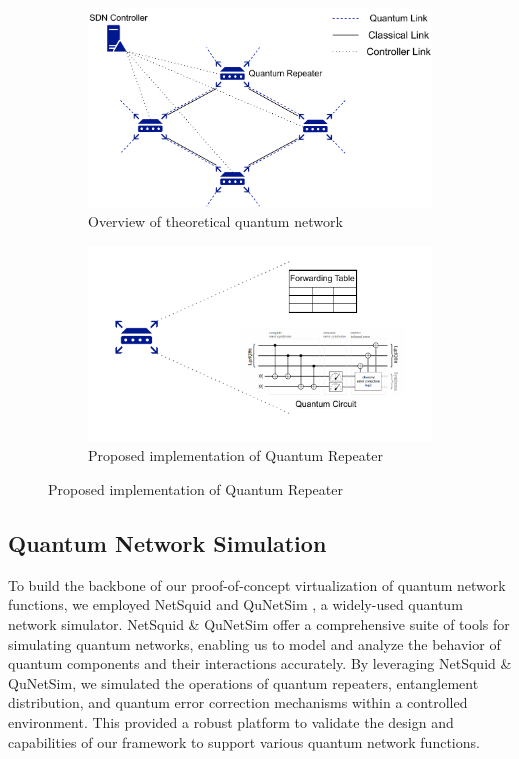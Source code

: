 \documentclass[sigplan,screen]{acmart}
\begin{document}
\begin{figure}
     \centering
     \begin{subfigure}[b]{0.475\textwidth}
         \centering
         \includegraphics[width=0.9\linewidth]{images/net.pdf}
         \caption{Overview of theoretical quantum network}
         \label{fig:net}
     \end{subfigure}
     \begin{subfigure}[b]{0.475\textwidth}
         \centering
         \includegraphics[width=0.9\linewidth]{images/QR.pdf}
         \caption{Proposed implementation of Quantum Repeater}
         \label{fig:router}
     \end{subfigure}
\end{figure}


\subsection{Quantum Network Simulation}
To build the backbone of our proof-of-concept virtualization of quantum network functions, we employed NetSquid \cite{Coopmans_2021} and QuNetSim \cite{Diadamo_2021}, a widely-used quantum network simulator. NetSquid \& QuNetSim offer a comprehensive suite of tools for simulating quantum networks, enabling us to model and analyze the behavior of quantum components and their interactions accurately. By leveraging NetSquid \& QuNetSim, we simulated the operations of quantum repeaters, entanglement distribution, and quantum error correction mechanisms within a controlled environment. This provided a robust platform to validate the design and capabilities of our framework to support various quantum network functions.
\end{document}
